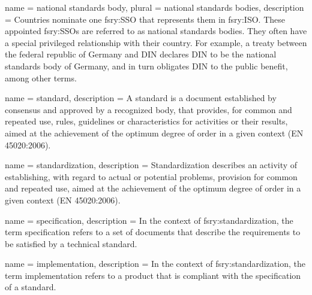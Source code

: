  { name = {national standards body}, plural =
  {national standards bodies}, description = {Countries nominate one
    \gls{fsry:SSO} that represents them in \gls{fsry:ISO}. These appointed
    \glspl{fsry:SSO} are referred to as national standards bodies. They
    often have a special privileged relationship with their
    country. For example, a treaty between the federal republic of
    Germany and DIN declares DIN to be the national standards body of
    Germany, and in turn obligates DIN to the public benefit, among
    other terms.}}

 { name = {standard},
  description = {A standard is a document established by consensus and
    approved by a recognized body, that provides, for common and
    repeated use, rules, guidelines or characteristics for activities
    or their results, aimed at the achievement of the optimum degree
    of order in a given context (EN 45020:2006).} }

 { name = {standardization},
  description = {Standardization describes an activity of
    establishing, with regard to actual or potential problems,
    provision for common and repeated use, aimed at the achievement of
    the optimum degree of order in a given context (EN 45020:2006).} }



 { name = {specification}, description = {In
    the context of \gls{fsry:standardization}, the term specification
    refers to a set of documents that describe the requirements to be
    satisfied by a technical standard.} }

 { name = {implementation}, description = {In
    the context of \gls{fsry:standardization}, the term implementation
    refers to a product that is compliant with the specification of a
    standard.} }

